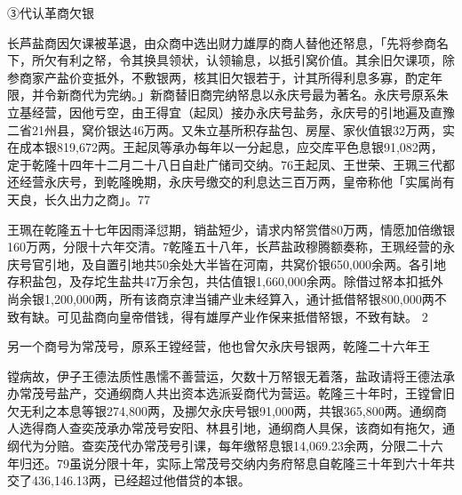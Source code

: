 ③代认革商欠银

长芦盐商因欠课被革退，由众商中选出财力雄厚的商人替他还帑息，「先将参商名下，所欠有利之帑，令其换具领状，认领输息，以抵引窝价值。其余旧欠课项，除参商家产盐价变抵外，不敷银两，核其旧欠银若于，计其所得利息多寡，酌定年限，并令新商代为完纳。」新商替旧商完纳帑息以永庆号最为著名。永庆号原系朱立基经营，因他亏空，由王得宜（起凤）接办永庆号盐务，永庆号的引地遍及直豫二省21州县，窝价银达46万两。又朱立基所积存盐包、房屋、家伙值银32万两，实在成本银819,672两。王起凤等承办每年以一分起息，应交库平色息银91,082两，定于乾隆十四年十二月二十八日自赴广储司交纳。76王起凤、王世荣、王珮三代都还经营永庆号，到乾隆晚期，永庆号缴交的利息达三百万两，皇帝称他「实属尚有天良，长久出力之商」。77

王珮在乾隆五十七年因雨泽愆期，销盐短少，请求内帑赏借80万两，情愿加倍缴银160万两，分限十六年交清。7乾隆五十八年，长芦盐政穆腾额奏称，王珮经营的永庆号官引地，及自置引地共50余处大半皆在河南，共窝价银650,000余两。各引地存积盐包，及存坨生盐共47万余包，共估值银1,660,000余两。除借过帑本扣抵外尚余银1,200,000两，所有该商京津当铺产业未经算入，通计抵借帑银800,000两不致有缺。可见盐商向皇帝借钱，得有雄厚产业作保来抵借帑银，不致有缺。 2

另一个商号为常茂号，原系王镗经营，他也曾欠永庆号银两，乾隆二十六年王

\vfill
\begin{BookNotes}
\end{BookNotes}

\noindent 镗病故，伊子王德法质性愚懦不善营运，欠数十万帑银无着落，盐政请将王德法承办常茂号盐产，交通纲商人共出资本选派妥商代为营运。乾隆三十年时，王镗曾旧欠无利之本息等银274,800两，及挪欠永庆号银91,000两，共银365,800两。通纲商人选得商人查奕茂承办常茂号安阳、林县引地，通纲商人具保，该商如有拖欠，通纲代为分赔。查奕茂代办常茂号引课，每年缴帑息银14,069.23余两，分限二十六年归还。79虽说分限十年，实际上常茂号交纳内务府帑息自乾隆三十年到六十年共交了436,146.13两，已经超过他借贷的本银。

